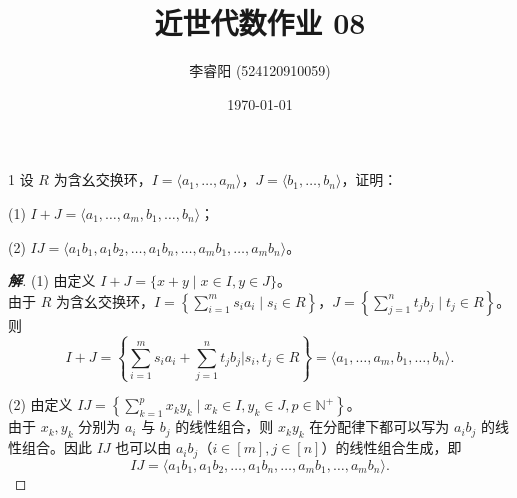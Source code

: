 \documentclass[12pt, a4paper]{article}
\title{近世代数作业 08}
\author{李睿阳 (524120910059)}
\date{\today}
\newenvironment{solution}{
    \begin{proof}[\textbf{解}]
}{
    \end{proof}
}
\begin{document}
\maketitle


\begin{problem}{1}
    设 $R$ 为含幺交换环，$I = \langle a_1, \dots, a_m \rangle$，$J = \langle b_1, \dots, b_n \rangle$，证明：
    
    (1) $I + J = \langle a_1, \dots, a_m, b_1, \dots, b_n \rangle$；
    
    (2) $IJ = \langle a_1b_1, a_1b_2, \dots, a_1b_n, \dots, a_mb_1, \dots, a_mb_n \rangle$。
\end{problem}
\begin{solution}
    (1) 由定义 $I + J = \{x + y \mid x \in I, y \in J\}$。\\
    由于 $R$ 为含幺交换环，$I = \left\{\sum_{i=1}^m s_i a_i \mid s_i \in R\right\}$，$J = \left\{\sum_{j=1}^n t_j b_j \mid t_j \in R\right\}$。\\
    则 
    \[
        I + J = \left\{\sum_{i=1}^m s_i a_i + \sum_{j=1}^n t_j b_j \mathrel{\Big|} s_i, t_j \in R\right\} = \langle a_1, \dots, a_m, b_1, \dots, b_n \rangle.
    \]

    (2) 由定义 $IJ = \left\{\sum_{k=1}^p x_k y_k \mid x_k \in I, y_k \in J, p \in \mathbb{N}^+\right\}$。\\
    由于 $x_k, y_k$ 分别为 $a_i$ 与 $b_j$ 的线性组合，则 $x_k y_k$ 在分配律下都可以写为 $a_i b_j$ 的线性组合。因此 $IJ$ 也可以由 $a_i b_j$（$i \in [m], j \in [n]$）的线性组合生成，即
    \[
        IJ = \langle a_1b_1, a_1b_2, \dots, a_1b_n, \dots, a_mb_1, \dots, a_mb_n \rangle.
    \]
\end{solution}
\end{document}
